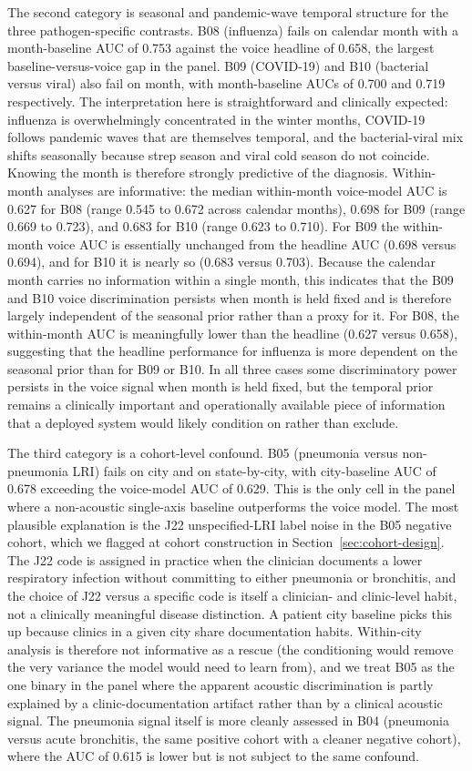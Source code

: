 \documentclass[utf8]{FrontiersinHarvard} %
\begin{document}
The second category is seasonal and pandemic-wave temporal structure for the three pathogen-specific contrasts. B08 (influenza) fails on calendar month with a month-baseline AUC of 0.753 against the voice headline of 0.658, the largest baseline-versus-voice gap in the panel. B09 (COVID-19) and B10 (bacterial versus viral) also fail on month, with month-baseline AUCs of 0.700 and 0.719 respectively. The interpretation here is straightforward and clinically expected: influenza is overwhelmingly concentrated in the winter months, COVID-19 follows pandemic waves that are themselves temporal, and the bacterial-viral mix shifts seasonally because strep season and viral cold season do not coincide. Knowing the month is therefore strongly predictive of the diagnosis. Within-month analyses are informative: the median within-month voice-model AUC is 0.627 for B08 (range 0.545 to 0.672 across calendar months), 0.698 for B09 (range 0.669 to 0.723), and 0.683 for B10 (range 0.623 to 0.710). For B09 the within-month voice AUC is essentially unchanged from the headline AUC (0.698 versus 0.694), and for B10 it is nearly so (0.683 versus 0.703). Because the calendar month carries no information within a single month, this indicates that the B09 and B10 voice discrimination persists when month is held fixed and is therefore largely independent of the seasonal prior rather than a proxy for it. For B08, the within-month AUC is meaningfully lower than the headline (0.627 versus 0.658), suggesting that the headline performance for influenza is more dependent on the seasonal prior than for B09 or B10. In all three cases some discriminatory power persists in the voice signal when month is held fixed, but the temporal prior remains a clinically important and operationally available piece of information that a deployed system would likely condition on rather than exclude.

The third category is a cohort-level confound. B05 (pneumonia versus non-pneumonia LRI) fails on city and on state-by-city, with city-baseline AUC of 0.678 exceeding the voice-model AUC of 0.629. This is the only cell in the panel where a non-acoustic single-axis baseline outperforms the voice model. The most plausible explanation is the J22 unspecified-LRI label noise in the B05 negative cohort, which we flagged at cohort construction in Section~\ref{sec:cohort-design}. The J22 code is assigned in practice when the clinician documents a lower respiratory infection without committing to either pneumonia or bronchitis, and the choice of J22 versus a specific code is itself a clinician- and clinic-level habit, not a clinically meaningful disease distinction. A patient city baseline picks this up because clinics in a given city share documentation habits. Within-city analysis is therefore not informative as a rescue (the conditioning would remove the very variance the model would need to learn from), and we treat B05 as the one binary in the panel where the apparent acoustic discrimination is partly explained by a clinic-documentation artifact rather than by a clinical acoustic signal. The pneumonia signal itself is more cleanly assessed in B04 (pneumonia versus acute bronchitis, the same positive cohort with a cleaner negative cohort), where the AUC of 0.615 is lower but is not subject to the same confound.
\end{document}
